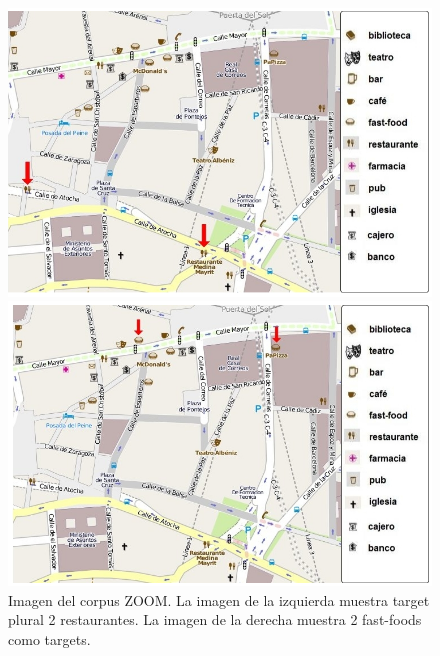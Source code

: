 \begin{figure}
\begin{minipage}[b]{0.5\linewidth}
\centering
\includegraphics[width=\textwidth]{images/corpus/mapa11.png}
\caption{}
\label{mapa11}
\end{minipage}
\hspace*{0cm}
\begin{minipage}[b]{0.5\linewidth}
\centering
\includegraphics[width=\textwidth]{images/corpus/mapa12.png}
\caption{}
\label{mapa12}
\end{minipage}
\caption{Imagen del corpus ZOOM. La imagen de la izquierda muestra target plural 2 restaurantes. La imagen de la derecha muestra 2 fast-foods como targets.}

\end{figure}

